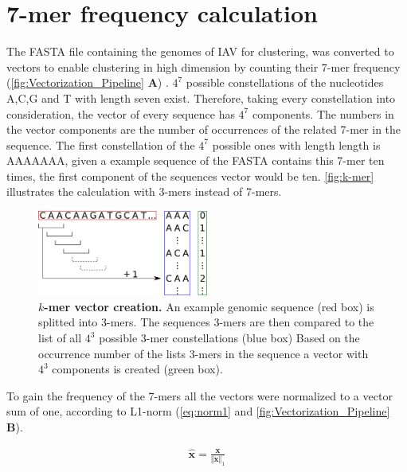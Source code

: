 \section{7-mer frequency calculation} \label{sec:Frequency}

The FASTA file containing the genomes of \gls{IAV} for clustering, was converted to vectors to enable clustering in high dimension by counting their 7-mer frequency (\autoref{fig:Vectorization_Pipeline} \textsf{\textbf{A}}) \autocite{edgar_muscle_2004}. $4^7$ possible constellations of the nucleotides A,C,G and T with length seven exist. Therefore, taking every constellation into consideration, the vector of every sequence has $4^7$ components. The numbers in the vector components are the number of occurrences of the related 7-mer in the sequence. The first constellation of the $4^7$ possible ones with length length is AAAAAAA, given a example sequence of the FASTA contains this 7-mer ten times, the first component of the sequences vector would be ten. \autoref{fig:k-mer} illustrates the calculation with 3-mers instead of 7-mers.

\begin{figure}[!hbt]
    \centering
    \includegraphics[width=0.5\textwidth]{Graphics/Kmer.pdf}
    \caption[$k$-mer vector creation]{\textbf{$k$-mer vector creation.} An example genomic sequence (red box) is splitted into 3-mers. The sequences 3-mers are then compared to the list of all $4^3$ possible 3-mer constellations (blue box) Based on the occurrence number of the lists 3-mers in the sequence a vector with $4^3$ components is created (green box).}
    \label{fig:k-mer}
\end{figure}

To gain the frequency of the 7-mers all the vectors were normalized to a vector sum of one, according to L1-norm (\autoref{eq:norm1} and \autoref{fig:Vectorization_Pipeline} \textsf{\textbf{B}}). 

\begin{equation}\label{eq:norm1}
    \begin{aligned}
        \mathbf{\hat{x}} = \frac{\mathbf{x}}{\Vert\mathbf{x}\Vert_1}
    \end{aligned}
\end{equation}

